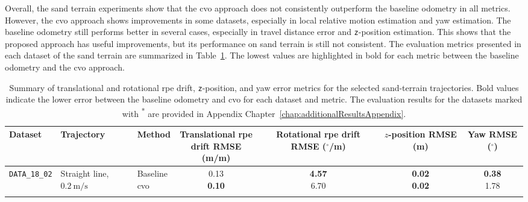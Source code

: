 \documentclass[report.tex]{subfiles}
\begin{document}
    Overall, the sand terrain experiments show that the \gls{cvo} approach does not consistently outperform the baseline odometry in all metrics. However, the \gls{cvo} approach shows improvements in some datasets, especially in local relative motion estimation and yaw estimation. The baseline odometry still performs better in several cases, especially in travel distance error and \texttt{z}-position estimation. This shows that the proposed approach has useful improvements, but its performance on sand terrain is still not consistent. The evaluation metrics presented in each dataset of the sand terrain are summarized in Table~\ref{tab:sand_terrain_metric_summary}. The lowest values are highlighted in bold for each metric between the baseline odometry and the \gls{cvo} approach. 
    
    \begin{table}[!htbp]
        \centering
        \caption[Summary of Sand terrain metrics]{Summary of translational and rotational \gls{rpe} drift, \texttt{z}-position, and yaw error metrics for the selected sand-terrain trajectories. Bold values indicate the lower error between the baseline odometry and \gls{cvo} for each dataset and metric. The evaluation results for the datasets marked with \textsuperscript{*} are provided in Appendix Chapter~\ref{chap:additionalResultsAppendix}.}
        \label{tab:sand_terrain_metric_summary}

        \scriptsize
        \setlength{\tabcolsep}{3.5pt}
        \renewcommand{\arraystretch}{1.12}
        \renewcommand{\tabularxcolumn}[1]{m{#1}}

        \begin{tabularx}{\textwidth}{
            >{\raggedright\arraybackslash}m{1.55cm}
            >{\raggedright\arraybackslash}X
            l
            cccc
        }
            \toprule
            Dataset &
            Trajectory &
            Method &
            \makecell{Translational \gls{rpe}\\drift RMSE (m/m)} &
            \makecell{Rotational \gls{rpe}\\drift RMSE ($^\circ$/m)} &
            \makecell{$z$-position\\RMSE (m)} &
            \makecell{Yaw\\RMSE ($^\circ$)} \\
            \midrule

            \texttt{DATA\_18\_02}
            & Straight line, $0.2~\mathrm{m/s}$
            & \makecell[l]{Baseline\\\gls{cvo}}
            & \makecell{0.13\\\textbf{0.10}}
            & \makecell{\textbf{4.57}\\6.70}
            & \makecell{\textbf{0.02}\\\textbf{0.02}}
            & \makecell{\textbf{0.38}\\1.78} \\
            \addlinespace


\end{tabularx}
\end{table}
\end{document}
